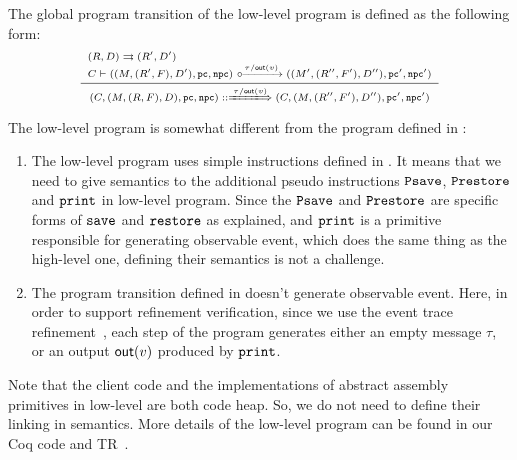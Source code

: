 The global program transition of the low-level \sparc{} program is defined
as the following form:
\[
    \scriptsize
    \infer
    {
        \LGlobTrans{(\code, (\Mem, (\RFile, \Wstack), \DBuf), \pc, \npc)}
            { \empmsg / \outEvt{\val} }
            {(\code, (\Mem, (\RFile'', \Wstack'), \DBuf''), \pc', \npc')}
    }
    {
        \begin{array}{l}
            \Dstep{(\RFile, \DBuf)}{(\RFile', \DBuf')} \\
            \llocalstep{\code}
                {((\Mem, (\RFile', \Wstack), \DBuf'), \pc, \npc)}
                { \empmsg / \outEvt{\val} }
                {((\Mem', (\RFile'', \Wstack'), \DBuf''), \pc', \npc')}
        \end{array}
    }
\]
{\color{blue}
The low-level \sparc{} program is somewhat different
from the \sparc{} program defined in
\Sec{\ref{sec:modeling}}:
\begin{enumerate}
    \item The low-level \sparc{} program uses simple
        instructions defined in
        \Fig{\ref{fig:syntax-of-concur-pseudo-sparc}}.
        It means that we need to give semantics to the additional
        pseudo instructions $\texttt{Psave}$, $\texttt{Prestore}$ and
        $\texttt{print}$ in low-level \sparc{} program.
        Since the $\texttt{Psave}$ and $\texttt{Prestore}$
        are specific forms of $\texttt{save}{}$ and
        $\texttt{restore}{}$ as explained, 
        and $\texttt{print}$ is a primitive
        responsible for generating observable event,
        which does the same thing as the high-level one,
        defining their semantics is not a challenge.
    \item The program transition defined in
        \Sec{\ref{sec:modeling}} doesn't generate
        observable event. Here, in order to support
        refinement verification, since 
        we use the event trace refinement~\cite{liang14lics},
        each step of the program
        generates either an empty message $\tau$,
        or an output $\textsf{out}({v})$ produced
        by $\texttt{print}$.
\end{enumerate}
}
{\color{blue} Note that the client
code and the implementations of abstract assembly primitives
in low-level are both \sparc{} code heap. So, we do not need
to define their linking in semantics.}
More details of the low-level program can be found in
our Coq code and TR~\cite{coqimp}.

